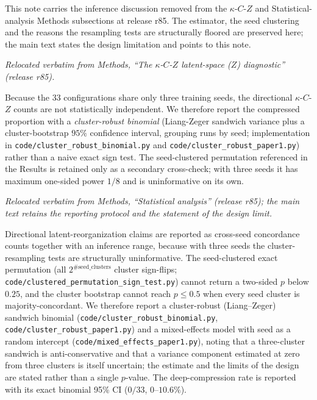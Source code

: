 \documentclass[11 pt,a4 paper]{article}
\begin{document}
This note carries the inference discussion removed from the $\kappa$-$C$-$Z$ and Statistical-analysis Methods subsections at release r85. The estimator, the seed clustering and the reasons the resampling tests are structurally floored are preserved here; the main text states the design limitation and points to this note.

\noindent\emph{Relocated verbatim from Methods, ``The $\kappa$-$C$-$Z$ latent-space ($Z$) diagnostic'' (release r85).}

Because the 33 configurations share only three training seeds, the directional $\kappa$-$C$-$Z$ counts are not statistically independent. We therefore report the compressed proportion with a \emph{cluster-robust binomial} (Liang-Zeger sandwich variance plus a cluster-bootstrap $95\%$ confidence interval, grouping runs by seed; implementation in \texttt{code/cluster\_robust\_binomial.py} and \texttt{code/cluster\_robust\_paper1.py}) rather than a naive exact sign test. The seed-clustered permutation referenced in the Results is retained only as a secondary cross-check; with three seeds it has maximum one-sided power $1/8$ and is uninformative on its own.

\noindent\emph{Relocated verbatim from Methods, ``Statistical analysis'' (release r85); the main text retains the reporting protocol and the statement of the design limit.}

Directional latent-reorganization claims are reported as cross-seed concordance counts together with an inference range, because with three seeds the cluster-resampling tests are structurally uninformative. The seed-clustered exact permutation (all $2^{\#\text{seed\_clusters}}$ cluster sign-flips; \texttt{code/clustered\_permutation\_sign\_test.py}) cannot return a two-sided $p$ below $0.25$, and the cluster bootstrap cannot reach $p\le0.5$ when every seed cluster is majority-concordant. We therefore report a cluster-robust (Liang--Zeger) sandwich binomial (\texttt{code/cluster\_robust\_binomial.py}, \texttt{code/cluster\_robust\_paper1.py}) and a mixed-effects model with seed as a random intercept (\texttt{code/mixed\_effects\_paper1.py}), noting that a three-cluster sandwich is anti-conservative and that a variance component estimated at zero from three clusters is itself uncertain; the estimate and the limits of the design are stated rather than a single $p$-value. The deep-compression rate is reported with its exact binomial 95\% CI ($0/33$, $0$--$10.6\%$).

\clearpage
\end{document}
